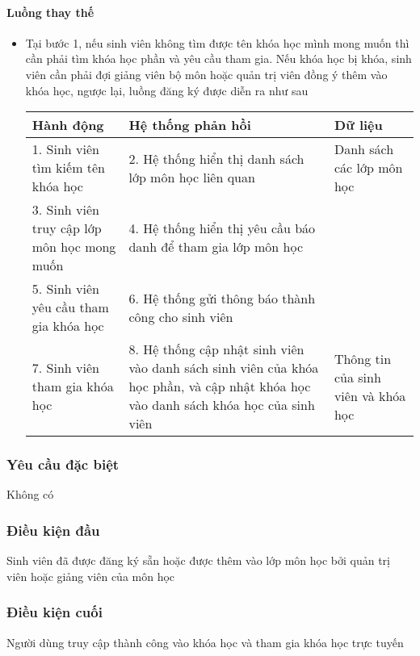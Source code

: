 \documentclass[./../main_file.tex]{subfiles}
\begin{document}
\paragraph{Luồng thay thế}
\begin{itemize}
	\item Tại bước 1, nếu sinh viên không tìm được tên khóa học mình mong muốn thì cần phải tìm khóa học phần và yêu cầu tham gia. Nếu khóa học bị khóa, sinh viên cần phải đợi giảng viên bộ môn hoặc quản trị viên đồng ý thêm vào khóa học, ngược lại, luồng đăng ký được diễn ra như sau
	\begin{longtable}{|p{}|p{}|p{}|}
			\hline
			\textbf{Hành động}                          & \textbf{Hệ thống phản hồi}                                    & \textbf{Dữ liệu}          \\ \hline
			1. Sinh viên tìm kiếm tên khóa học           & 2. Hệ thống hiển thị danh sách lớp môn học liên quan          & Danh sách các lớp môn học \\ \hline
			3. Sinh viên truy cập lớp môn học mong muốn & 4. Hệ thống hiển thị yêu cầu báo danh để tham gia lớp môn học &                          \\ \hline
			5. Sinh viên yêu cầu tham gia khóa học & 6. Hệ thống gửi thông báo thành công cho sinh viên            &                           \\ \hline
			7. Sinh viên tham gia khóa học &
			8. Hệ thống cập nhật sinh viên vào danh sách sinh viên của khóa học phần, và cập nhật khóa học vào danh sách khóa học của sinh viên &
			Thông tin của sinh viên và khóa học \\ \hline
	\end{longtable}
\end{itemize}
\subsubsection{Yêu cầu đặc biệt}
Không có

\subsubsection{Điều kiện đầu}
Sinh viên đã được đăng ký sẵn hoặc được thêm vào lớp môn học bởi quản trị viên hoặc giảng viên của môn học

\subsubsection{Điều kiện cuối}
Người dùng truy cập thành công vào khóa học và tham gia khóa học trực tuyến
\end{document}
